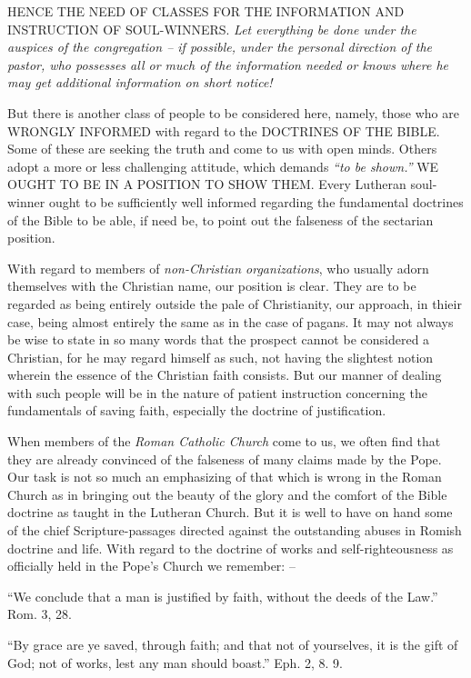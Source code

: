 \documentclass[
]{book}
\begin{document}
HENCE THE NEED OF CLASSES FOR THE INFORMATION AND INSTRUCTION OF SOUL-WINNERS. \emph{Let everything be done under the auspices of the congregation -- if possible, under the personal direction of the pastor, who possesses all or much of the information needed or knows where he may get additional information on short notice!}

But there is another class of people to be considered here, namely, those who are WRONGLY INFORMED with regard to the DOCTRINES OF THE BIBLE. Some of these are seeking the truth and come to us with open minds. Others adopt a more or less challenging attitude, which demands \emph{``to be shown.''} WE OUGHT TO BE IN A POSITION TO SHOW THEM. Every Lutheran soul-winner ought to be sufficiently well informed regarding the fundamental doctrines of the Bible to be able, if need be, to point out the falseness of the sectarian position.

With regard to members of \emph{non-Christian organizations}, who usually adorn themselves with the Christian name, our position is clear. They are to be regarded as being entirely outside the pale of Christianity, our approach, in thieir case, being almost entirely the same as in the case of pagans. It may not always be wise to state in so many words that the prospect cannot be considered a Christian, for he may regard himself as such, not having the slightest notion wherein the essence of the Christian faith consists. But our manner of dealing with such people will be in the nature of patient instruction concerning the fundamentals of saving faith, especially the doctrine of justification.

When members of the \emph{Roman Catholic Church} come to us, we often find that they are already convinced of the falseness of many claims made by the Pope. Our task is not so much an emphasizing of that which is wrong in the Roman Church as in bringing out the beauty of the glory and the comfort of the Bible doctrine as taught in the Lutheran Church. But it is well to have on hand some of the chief Scripture-passages directed against the outstanding abuses in Romish doctrine and life. With regard to the doctrine of works and self-righteousness as officially held in the Pope's Church we remember: --

``We conclude that a man is justified by faith, without the deeds of the Law.'' Rom. 3, 28.

``By grace are ye saved, through faith; and that not of yourselves, it is the gift of God; not of works, lest any man should boast.'' Eph. 2, 8. 9.
\end{document}
